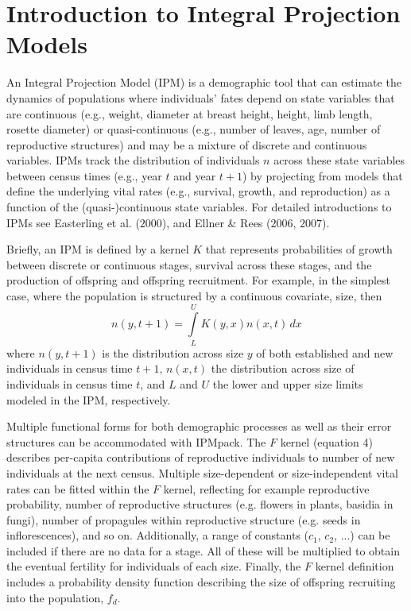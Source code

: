 \documentclass{article}
\begin{document}
\section{Introduction to Integral Projection Models}
An Integral Projection Model (IPM) is a demographic tool that can estimate the
dynamics of populations where individuals' fates depend on state variables that
are continuous (e.g., weight, diameter at breast height, height, limb length,
rosette diameter) or quasi-continuous (e.g., number of leaves, age, number of
reproductive structures) and may be a mixture of discrete and continuous
variables. IPMs track the distribution of individuals $n$ across these state
variables between census times (e.g., year $t$ and year $t+1$) by projecting from models that define the underlying vital rates (e.g., survival, growth, and reproduction) as a function of the (quasi-)continuous state variables. For detailed introductions to IPMs see Easterling et al. ($2000$), and Ellner \& Rees ($2006$, $2007$).

Briefly, an IPM is defined by a kernel $K$ that represents probabilities of growth between discrete or continuous stages, survival across these stages, and the production of offspring and offspring recruitment.  For example, in the simplest case, where the population is structured by a continuous covariate, size, then 
\begin{equation}
n(y, t+1) = \int\limits_{L}^{U} K(y, x) n(x, t) \, dx       
\end{equation}
where $n(y, t+1)$ is the distribution across size $y$ of both established and new individuals in census time $t+1$, $n(x, t)$ the distribution across size of individuals in census time $t$, and $L$ and $U$ the lower and upper size limits modeled in the IPM, respectively. 

Multiple functional forms for both demographic processes as well as their error
structures can be  accommodated with IPMpack. The $F$ kernel (equation 4)
describes per-capita contributions of reproductive individuals to number of new
individuals at the next census. Multiple size-dependent or size-independent
vital rates can be fitted within the $F$ kernel, reflecting for example
reproductive probability, number of reproductive structures (e.g. flowers in
plants, basidia in fungi), number of propagules within reproductive structure
(e.g. seeds in inflorescences), and so on. Additionally, a range of constants
($c_1$, $c_2$, ...) can be included if there are no data for a stage. All of these will be multiplied to obtain the eventual fertility for individuals of each size. Finally, the $F$ kernel definition includes a probability density function describing the size of offspring recruiting into the population, $f_d$. 
\end{document}
